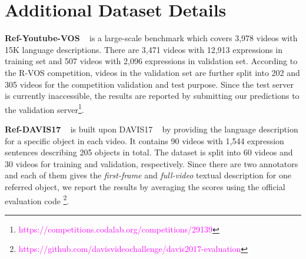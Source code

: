 \documentclass[10pt,twocolumn,letterpaper]{article}
\begin{document}
{\fi



{\small


}

\clearpage

\appendix

\renewcommand\thefigure{\Alph{section}\arabic{figure}}  
\setcounter{figure}{0} 
\renewcommand\thetable{\Alph{section}\arabic{table}}  
\setcounter{table}{0}



\section{Additional Dataset Details}

\textbf{Ref-Youtube-VOS} ~\cite{seo2020urvos} is a large-scale benchmark which covers 3,978 videos with 15K language descriptions. There are 3,471 videos with 12,913 expressions in training set and 507 videos with 2,096 expressions in validation set. According to the R-VOS competition, videos in the validation set are further split into 202 and 305 videos for the competition validation and test purpose. Since the test server is currently inaccessible, the results are reported by submitting our predictions to the validation server\footnote{\textcolor{magenta}{https://competitions.codalab.org/competitions/29139}}.

\textbf{Ref-DAVIS17} ~\cite{khoreva2018rvos} is built upon DAVIS17 ~\cite{pont2017davis} by providing the language description for a specific object in each video. It contains 90 videos with 1,544 expression sentences describing 205 objects in total. The dataset is split into 60 videos and 30 videos for training and validation, respectively. Since there are two annotators and each of them gives the \textit{first-frame} and \textit{full-video} textual description for one referred object, we report the results by averaging the scores using the official evaluation code \footnote{\textcolor{magenta}{https://github.com/davisvideochallenge/davis2017-evaluation}}. 
}
\end{document}
